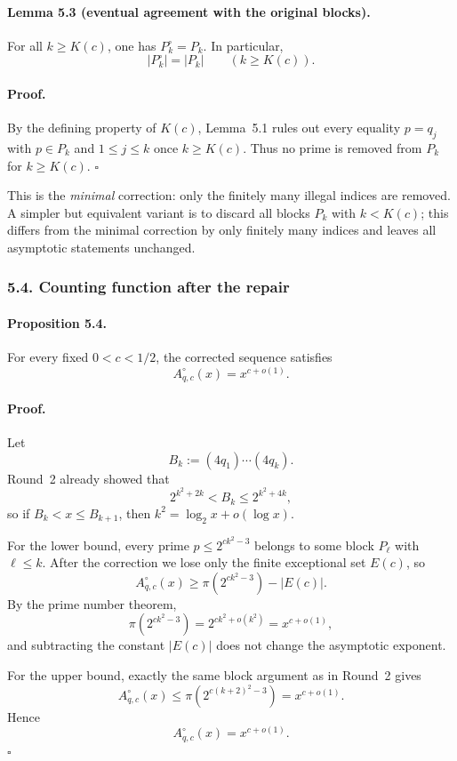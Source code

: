 \paragraph{Lemma 5.3 (eventual agreement with the original blocks).}
For all $k\ge K(c)$, one has $P_k^{\circ}=P_k$.
In particular,
\[
|P_k^{\circ}|=|P_k| \qquad (k\ge K(c)).
\]

\paragraph{Proof.}
By the defining property of $K(c)$, Lemma~5.1 rules out every equality
$p=q_j$ with $p\in P_k$ and $1\le j\le k$ once $k\ge K(c)$.
Thus no prime is removed from $P_k$ for $k\ge K(c)$. \hfill$\square$

\medskip

This is the \emph{minimal} correction: only the finitely many illegal indices are removed.
A simpler but equivalent variant is to discard all blocks $P_k$ with $k<K(c)$; this differs from the minimal correction by only finitely many indices and leaves all asymptotic statements unchanged.

\subsubsection*{5.4. Counting function after the repair}

\paragraph{Proposition 5.4.}
For every fixed $0<c<1/2$, the corrected sequence satisfies
\[
A_{q,c}^{\circ}(x)=x^{c+o(1)}.
\]

\paragraph{Proof.}
Let
\[
B_k:=(4q_1)\cdots (4q_k).
\]
Round~2 already showed that
\[
2^{k^2+2k}<B_k\le 2^{k^2+4k},
\]
so if $B_k<x\le B_{k+1}$, then $k^2=\log_2 x+o(\log x)$.

For the lower bound, every prime $p\le 2^{ck^2-3}$ belongs to some block $P_{\ell}$ with $\ell\le k$.
After the correction we lose only the finite exceptional set $E(c)$, so
\[
A_{q,c}^{\circ}(x)\ge \pi(2^{ck^2-3})-|E(c)|.
\]
By the prime number theorem,
\[
\pi(2^{ck^2-3})=2^{ck^2+o(k^2)}=x^{c+o(1)},
\]
and subtracting the constant $|E(c)|$ does not change the asymptotic exponent.

For the upper bound, exactly the same block argument as in Round~2 gives
\[
A_{q,c}^{\circ}(x)\le \pi(2^{c(k+2)^2-3})=x^{c+o(1)}.
\]
Hence
\[
A_{q,c}^{\circ}(x)=x^{c+o(1)}.
\]
\hfill$\square$


